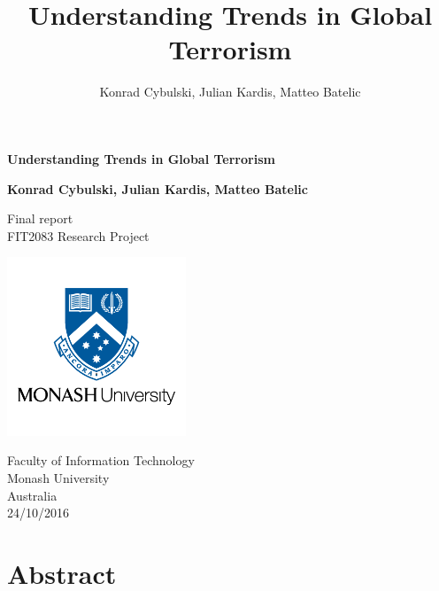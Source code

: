 \documentclass[10pt,a4paper]{article}
\author{Konrad Cybulski, Julian Kardis, Matteo Batelic}
\title{Understanding Trends in Global Terrorism}
\begin{document}
\begin{titlepage}
    \begin{center}
        \vspace*{1cm}
        
        \LARGE
        \textbf{Understanding Trends in Global Terrorism}
        
        \vspace{4cm}
        
		\Large 
        
        \textbf{Konrad Cybulski, Julian Kardis, Matteo Batelic}
        
        
        \LARGE
        \vspace{2cm}

        
        
        \vfill
        
        
        
        Final report \\
        FIT2083 Research Project
        
        
        \includegraphics[width=0.4\textwidth]{monash-university-logo.png}
              
        
        \large
        Faculty of Information Technology\\
        Monash University\\
        Australia\\
        24/10/2016
        
    \end{center}
\end{titlepage}

\pagebreak
\tableofcontents
\pagebreak


\section{Abstract} 
\end{document}
